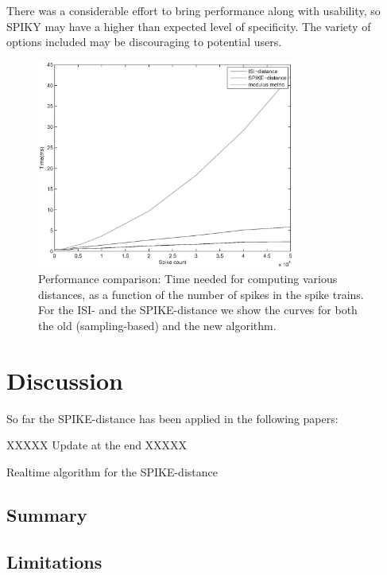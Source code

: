 \documentclass[10pt,twocolumn]{elsart5p}
\begin{document}
There was a considerable effort to bring performance along with usability, so SPIKY may have a higher than expected level of specificity. The variety of options included may be discouraging to potential users.

\begin{figure}
    \includegraphics[width=85mm]{Fig5_Performance_Comparison.eps}
    \caption{\abb\label{fig:Fig5-Performance-Comparison} Performance comparison: Time needed for computing various distances, as a function of the number of spikes in the spike trains. For the ISI- and the SPIKE-distance we show the curves for both the old (sampling-based) and the new algorithm.}
\end{figure}

%
%
\section{\label{s:Discussion} Discussion}

So far the SPIKE-distance has been applied in the following papers:

\citep{Papoutsi13, DiPoppa13, Rusu14, Sacre14}

XXXXX Update at the end XXXXX

Realtime algorithm for the SPIKE-distance

\subsection{\label{ss:Summary} Summary}

\subsection{\label{ss:Limitations} Limitations}
\end{document}
